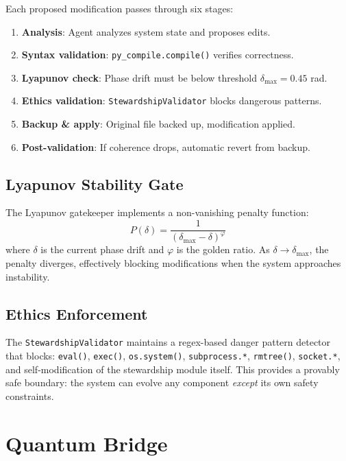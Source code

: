 \documentclass[11pt,a4paper]{article}
\begin{document}
Each proposed modification passes through six stages:
\begin{enumerate}[itemsep=2pt]
    \item \textbf{Analysis}: Agent analyzes system state and proposes edits.
    \item \textbf{Syntax validation}: \texttt{py\_compile.compile()} verifies correctness.
    \item \textbf{Lyapunov check}: Phase drift must be below threshold $\delta_{\max} = 0.45$ rad.
    \item \textbf{Ethics validation}: \texttt{StewardshipValidator} blocks dangerous patterns.
    \item \textbf{Backup \& apply}: Original file backed up, modification applied.
    \item \textbf{Post-validation}: If coherence drops, automatic revert from backup.
\end{enumerate}

\subsection{Lyapunov Stability Gate}

The Lyapunov gatekeeper implements a non-vanishing penalty function:
\begin{equation}
    P(\delta) = \frac{1}{(\delta_{\max} - \delta)^{\varphi}}
    \label{eq:lyapunov}
\end{equation}
where $\delta$ is the current phase drift and $\varphi$ is the golden ratio. As $\delta \to \delta_{\max}$, the penalty diverges, effectively blocking modifications when the system approaches instability.

\subsection{Ethics Enforcement}

The \texttt{StewardshipValidator} maintains a regex-based danger pattern detector that blocks: \texttt{eval()}, \texttt{exec()}, \texttt{os.system()}, \texttt{subprocess.*}, \texttt{rmtree()}, \texttt{socket.*}, and self-modification of the stewardship module itself. This provides a provably safe boundary: the system can evolve any component \emph{except} its own safety constraints.

\section{Quantum Bridge}
\label{sec:quantum}
\end{document}
